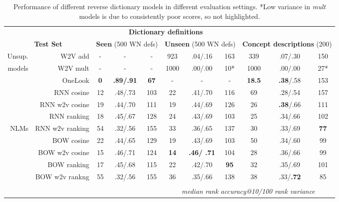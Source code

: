 \documentclass[11pt,letterpaper]{article}
\begin{document}
\begin{table*}[ht]
    \centering
{\small
\hfill{}
\begin{tabular}{r|r|ccc|ccc|ccc|}

\multicolumn{2}{c}{}& \multicolumn{6}{|c|}{\bf Dictionary definitions} \\
\multicolumn{2}{c}{\textbf{Test Set }}&\multicolumn{3}{|c|}{\textbf{Seen} (500 WN defs)}& \multicolumn{3}{|c|}{\textbf{Unseen} (500 WN defs)} & \multicolumn{3}{|c|}{\textbf{Concept descriptions} (200)} \\

\hline

\rule{0pt}{2ex} 

Unsup. & W2V add & - & - & - & 923 & .04/.16 & 163 & 339 & .07/.30 & 150    \\
models  & W2V mult &- &- & -& 1000 & .00/.00 & 10* &   1000 & .00/.00 & 27* \\
\hdashline 
\rule{0pt}{2ex} 
& OneLook & \bf 0 & \bf .89/.91 & \bf 67  & - & - & - &  \bf 18.5 &  {\bf .38}/.58 & 153    \\
\hdashline 
\rule{0pt}{2ex} 
 & RNN cosine & 12 & .48/.73 & 103 &  22 & .41/.70 & 116 & 69 & .28/.54 & 157 \\
 & RNN w2v cosine & 19 & .44/.70 & 111 & 19 & .44/.69 & 126 & 26 & {\bf .38}/.66 & 111  \\
 & RNN ranking & 18 & .45/.67 & 128 &	24 & .43/.69 & 103 & 25 & .34/.66 & 102 \\
NLMs & RNN w2v ranking & 54 & .32/.56 & 155 & 33 & .36/.65 & 137 &	30 & .33/.69 & \bf 77 \\
& BOW cosine &22 & .44/.65 & 129 & 19 & .43/.69 & 103 & 50 & .34/.60 &  99 \\
& BOW w2v cosine & 15 & .46/.71 & 124 &  \bf14 & \bf .46/ .71 &  104	 & 28 & .36/.66 &  99 \\
& BOW ranking & 17 & .45/.68 &  115 &	 22 & .42/.70 & \bf 95 &	32 & .35/.69 & 101   \\
& BOW w2v rankng & 55 & .32/.56 & 155 &	36 & .35/.66 & 138 &	38 & .33/{\bf .72} & 85 \\

\hline 

\multicolumn{11}{c}{} \\
\multicolumn{5}{c}{}& \multicolumn{6}{|c|}{\emph{median rank \hspace{5mm}   accuracy@10/100 \hspace{5mm}   rank variance} } \\

\end{tabular}}
\caption{Performance of different reverse dictionary models in different evaluation settings. *Low variance in \emph{mult} models is due to consistently poor scores, so not highlighted.}
\label{results}
\end{table*}
\end{document}
